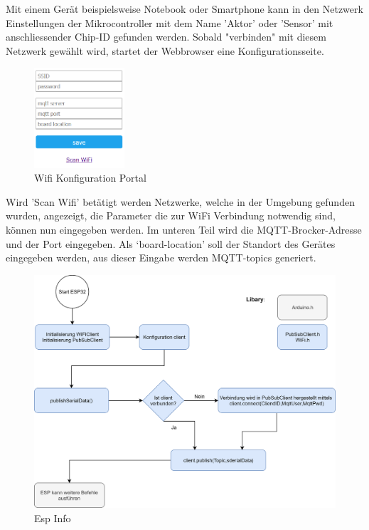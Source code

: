 Mit einem Gerät beispielsweise Notebook oder Smartphone kann in den Netzwerk Einstellungen der Mikrocontroller mit dem Name 'Aktor' oder 'Sensor' mit anschliessender Chip-ID gefunden werden. 
Sobald "verbinden" mit diesem Netzwerk gewählt wird, startet der Webbrowser eine Konfigurationsseite. 

\begin{figure}[H]
	\centering
	\includegraphics[width=0.3\textwidth]{graphics/Configportal2.PNG}
	\caption{Wifi Konfiguration Portal}
	\label{pic: Configportal}
\end{figure}   

Wird 'Scan Wifi' betätigt werden Netzwerke, welche in der Umgebung gefunden wurden, angezeigt, die Parameter die zur WiFi Verbindung notwendig sind, können nun eingegeben werden. Im unteren Teil wird die MQTT-Brocker-Adresse und der Port eingegeben. Als `board-location' soll der Standort des Gerätes eingegeben werden, aus dieser Eingabe werden MQTT-topics generiert. 

\begin{figure}[H]
	\centering
	\includegraphics[width=\textwidth]{graphics/MQTTSubPubClient.png}
	\caption{Esp Info}
	\label{pic: SubPubClient}
\end{figure}   

